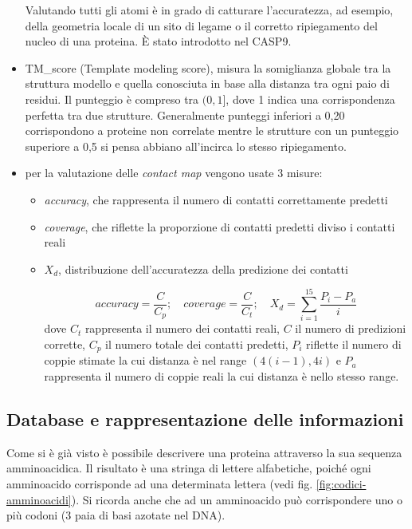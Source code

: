 \begin{itemize}
	\par Valutando tutti gli atomi è in grado di catturare l'accuratezza, ad esempio, della geometria locale di un sito di legame o il corretto ripiegamento del nucleo di una proteina. È stato introdotto nel CASP9. \\
	
	\item TM\_score (Template modeling score), misura la somiglianza globale tra la struttura modello e quella conosciuta in base alla distanza tra ogni paio di residui. Il punteggio è compreso tra $(0, 1]$, dove 1 indica una corrispondenza perfetta tra due strutture. Generalmente punteggi inferiori a 0,20 corrispondono a proteine non correlate mentre le strutture con un punteggio superiore a 0,5 si pensa abbiano all'incirca lo stesso ripiegamento.\\
	
	\item per la valutazione delle \textit{contact map} vengono usate 3 misure:
	\begin{itemize}
		\item \textit{accuracy}, che rappresenta il numero di contatti correttamente predetti
		\item \textit{coverage}, che riflette la proporzione di contatti predetti diviso i contatti reali
		\item $X_{d}$, distribuzione dell'accuratezza della predizione dei contatti
		
					\[ accuracy=\frac{C}{C_{p}}; \quad coverage=\frac{C}{C_{t}}; \quad X_{d}=\sum_{i=1}^{15} \frac{P_{i}-P_{a}}{i} \]
		dove $C_{t}$ rappresenta il numero dei contatti reali, $C$ il numero di predizioni corrette, $C_{p}$ il numero totale dei contatti predetti, $P_{i}$ riflette il numero di coppie stimate la cui distanza è nel range $(4(i-1), 4i)$ e $P_{a}$ rappresenta il numero di coppie reali la cui distanza è nello stesso range.
	\end{itemize}
\end{itemize}


\subsection{Database e rappresentazione delle informazioni} \label{sec:database}

Come si è già visto è possibile descrivere una proteina attraverso la sua sequenza amminoacidica. Il risultato è una stringa di lettere alfabetiche, poiché ogni amminoacido corrisponde ad una determinata lettera (vedi fig. \ref{fig:codici-amminoacidi}). Si ricorda anche che ad un amminoacido può corrispondere uno o più codoni (3 paia di basi azotate nel DNA). \\

